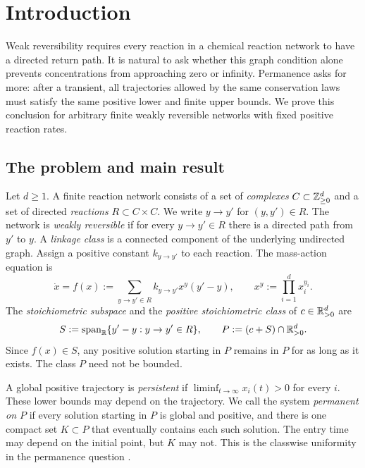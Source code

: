 \section{Introduction}\label{sec:introduction}

Weak reversibility requires every reaction in a chemical reaction network
to have a directed return path. It is natural to ask whether this graph
condition alone prevents concentrations from approaching zero or infinity.
Permanence asks for more: after a transient, all trajectories allowed by
the same conservation laws must satisfy the same positive lower and finite
upper bounds. We prove this conclusion for arbitrary finite weakly
reversible networks with fixed positive reaction rates.

\subsection{The problem and main result}

Let $d\geq1$. A finite reaction network consists of a set of
\emph{complexes} $C\subset\mathbb Z_{\geq0}^d$ and a set of directed
\emph{reactions} $R\subset C\times C$. We write $y\to y'$ for
$(y,y')\in R$. The network is \emph{weakly reversible} if for every
$y\to y'\in R$ there is a directed path from $y'$ to $y$. A
\emph{linkage class} is a connected component of the underlying undirected
graph. Assign a positive constant $k_{y\to y'}$ to each reaction. The
mass-action equation is
\begin{equation}\label{eq:mass-action}
  \dot x=f(x):=\sum_{y\to y'\in R} k_{y\to y'}x^y(y'-y),
  \qquad x^y:=\prod_{i=1}^d x_i^{y_i}.
\end{equation}
The \emph{stoichiometric subspace} and the \emph{positive stoichiometric
class} of $c\in\mathbb R_{>0}^d$ are
\[
  S:=\operatorname{span}_{\mathbb R}\{y'-y:y\to y'\in R\},
  \qquad P:=(c+S)\cap\mathbb R_{>0}^d.
\]
Since $f(x)\in S$, any positive solution starting in $P$ remains in $P$
for as long as it exists. The class $P$ need not be bounded.

A global positive trajectory is \emph{persistent} if
$\liminf_{t\to\infty}x_i(t)>0$ for every $i$. These lower bounds may
depend on the trajectory. We call the system \emph{permanent on $P$} if
every solution starting in $P$ is global and positive, and there is one
compact set $K\subset P$ that eventually contains each such solution.
The entry time may depend on the initial point, but $K$ may not. This is
the classwise uniformity in the permanence question
\cite[Definition~4.1]{BorosHofbauer2020}.

